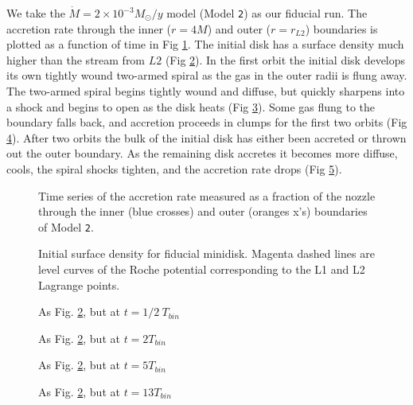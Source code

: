 \documentclass{emulateapj}
\newcommand{\model}[1]{{Model \texttt{#1}}}
\begin{document}
We take the $\dot{M} = 2 \times 10^{-3} M_\odot / y$ model (\model{2}) as our fiducial run.  The accretion rate through the inner ($r=4 M$) and outer ($r=r_{L2}$) boundaries is plotted as a function of time in Fig \ref{fi:mdot-fid}. The initial disk has a surface density much higher than the stream from $L2$ (Fig \ref{fi:sig-fid-0}).  In the first orbit the initial disk develops its own tightly wound two-armed spiral as the gas in the outer radii is flung away.  The two-armed spiral begins tightly wound and diffuse, but quickly sharpens into a shock and begins to open as the disk heats (Fig \ref{fi:sig-fid-05}).  Some gas flung to the boundary falls back, and accretion proceeds in clumps for the first two orbits (Fig \ref{fi:sig-fid-2}).  After two orbits the bulk of the initial disk has either been accreted or thrown out the outer boundary.  As the remaining disk accretes it becomes more diffuse, cools, the spiral shocks tighten, and the accretion rate drops (Fig \ref{fi:sig-fid-5}).

\begin{figure}
\caption{\label{fi:mdot-fid} Time series of the accretion rate measured as a fraction of the nozzle through the inner (blue crosses) and outer (oranges x's) boundaries of \model{2}.}
\end{figure}

\begin{figure}
\caption{\label{fi:sig-fid-0} Initial surface density for fiducial minidisk.  Magenta dashed lines are level curves of the Roche potential corresponding to the L1 and L2 Lagrange points.}
\end{figure}

\begin{figure}
\caption{\label{fi:sig-fid-05} As Fig. \ref{fi:sig-fid-0}, but at $t = 1/2\ T_{bin}$}
\end{figure}

\begin{figure}
\caption{\label{fi:sig-fid-2} As Fig. \ref{fi:sig-fid-0}, but at $t = 2 T_{bin}$}
\end{figure}

\begin{figure}
\caption{\label{fi:sig-fid-5} As Fig. \ref{fi:sig-fid-0}, but at $t = 5 T_{bin}$}
\end{figure}

\begin{figure}
\caption{\label{fi:sig-fid-13} As Fig. \ref{fi:sig-fid-0}, but at $t = 13 T_{bin}$}
\end{figure}
\end{document}
